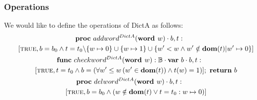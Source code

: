 \documentclass[a4paper,12pt,fleqn]{scrartcl}
\newcommand{\domt}{\textbf{dom}(t)}
\newcommand{\WORD}{\textbf{word }}
\begin{document}
\subsubsection{Operations}
We would like to define the operations of DictA as follows:
\begin{gather*}
    \PROC\ addword^{DictA}(\WORD w)\cdot b, t:\\
        \qquad [\True, b = b_0\And t = {t_0\backslash\{w\mapsto 0 \} \cup\{w\mapsto 1\}\cup\{w' < w\And 
                    w'\notin \domt | w'\mapsto 0\}}]\\ 
    \FUNC\ checkword^{DictA}(\WORD w):\mathbb{B}\cdot
        \VAR\ b\cdot b, t:\\
        \qquad[\True, t = t_0\And b = (\All{w' \leq w}{w'\in \domt} \And t(w)=1)];\ \RETURN\ b\\
    \PROC\ delword^{DictA}(\WORD w)\cdot b, t:\\
        \qquad[\True , b = b_0\And
        (w \notin \domt \OR t= t_0: w \mapsto 0)]\\ 
\end{gather*} 
\end{document}
